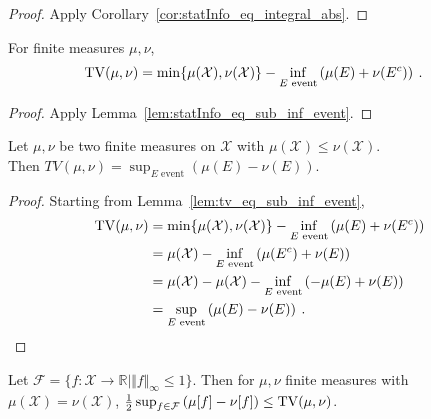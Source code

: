 \begin{proof}%
{}
Apply Corollary~\ref{cor:statInfo_eq_integral_abs}.
\end{proof}


\begin{lemma}
  \label{lem:tv_eq_sub_inf_event}
  For finite measures $\mu, \nu$,
  \begin{align*}
  \operatorname{TV}(\mu, \nu)
  &= \min\{\mu(\mathcal X), \nu(\mathcal X)\} - \inf_{E \text{ event}} \left( \mu(E) + \nu(E^c) \right)
  \: .
  \end{align*}
\end{lemma}

\begin{proof}%
{}
Apply Lemma~\ref{lem:statInfo_eq_sub_inf_event}.
\end{proof}


\begin{theorem}
  \label{thm:tv_eq_sup_sub_measure}
  \uses{}
  Let $\mu, \nu$ be two finite measures on $\mathcal X$ with $\mu(\mathcal X) \leq \nu(\mathcal X)$.\\
  Then $TV(\mu, \nu) = \sup_{E \text{ event}} \left( \mu(E) - \nu(E) \right)$.
\end{theorem}

\begin{proof}%
{}
Starting from Lemma~\ref{lem:tv_eq_sub_inf_event},
\begin{align*}
\operatorname{TV}(\mu, \nu)
&= \min\{\mu(\mathcal X), \nu(\mathcal X)\} - \inf_{E \text{ event}} \left( \mu(E) + \nu(E^c) \right)
\\
&= \mu(\mathcal X) - \inf_{E \text{ event}} \left( \mu(E^c) + \nu(E) \right)
\\
&= \mu(\mathcal X) - \mu(\mathcal X) - \inf_{E \text{ event}} \left( -\mu(E) + \nu(E) \right)
\\
&= \sup_{E \text{ event}} \left( \mu(E) - \nu(E) \right)
\: .
\end{align*}
\end{proof}


\begin{lemma}
  \label{lem:tv_eq_sup_aux}
  Let $\mathcal F = \{f : \mathcal X \to \mathbb{R} \mid \Vert f \Vert_\infty \le 1\}$.
  Then for $\mu, \nu$ finite measures with $\mu(\mathcal X) = \nu(\mathcal X)$, $\frac{1}{2} \sup_{f \in \mathcal F} \left( \mu[f] - \nu[f] \right) \le \operatorname{TV}(\mu, \nu)$.
\end{lemma}

